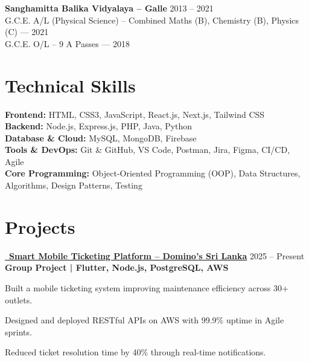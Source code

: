 \documentclass[letterpaper,11.8pt]{article}
\newenvironment{resume_list}{
  \vspace{-1pt}
  \begin{itemize}[itemsep=2pt, leftmargin=14pt]
}{
  \end{itemize}\vspace{-2pt}
}
\begin{document}
\vspace{5pt}

\noindent\textbf{Sanghamitta Balika Vidyalaya – Galle} \hfill 2013 – 2021\\
G.C.E. A/L (Physical Science) – Combined Maths (B), Chemistry (B), Physics (C) — 2021\\
G.C.E. O/L – 9 A Passes — 2018


\section{Technical Skills}
\vspace{-1pt}

\textbf{Frontend:} HTML, CSS3, JavaScript, React.js, Next.js, Tailwind CSS\\[3pt]
\textbf{Backend:} Node.js, Express.js, PHP, Java, Python\\[3pt]
\textbf{Database \& Cloud:} MySQL, MongoDB, Firebase\\[3pt]
\textbf{Tools \& DevOps:} Git \& GitHub, VS Code, Postman, Jira, Figma, CI/CD, Agile\\[3pt]
\textbf{Core Programming:} Object-Oriented Programming (OOP), Data Structures, Algorithms, Design Patterns, Testing

\section{Projects}
\vspace{-2pt}

\newcommand{\project}[5]{%
  \noindent
  \href{#1}{\faGithub~\textbf{#2}} \hfill #3\\[-1pt]
  \textbf{#4}\\[-5pt]
  \begin{resume_list}
    #5
  \end{resume_list}
  \vspace{6pt}
}

\project{https://github.com/fixpoint-tech}
{Smart Mobile Ticketing Platform – Domino's Sri Lanka}
{2025 – Present}
{Group Project | Flutter, Node.js, PostgreSQL, AWS}{
  \item Built a mobile ticketing system improving maintenance efficiency across 30+ outlets.
  \item Designed and deployed RESTful APIs on AWS with 99.9\% uptime in Agile sprints.
  \item Reduced ticket resolution time by 40\% through real-time notifications.
}
\end{document}
